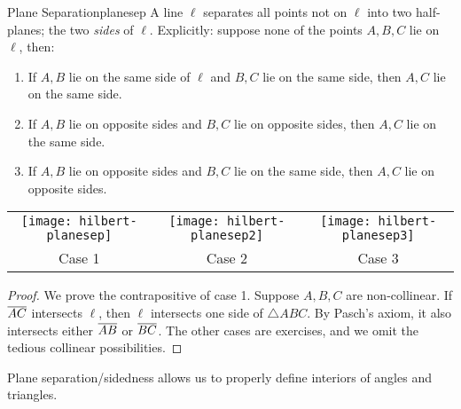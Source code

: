 \begin{thm}{Plane Separation}{planesep}
	A line $\ell$ separates all points not on $\ell$ into two half-planes; the two \emph{sides} of $\ell$. Explicitly: suppose none of the points $A,B,C$ lie on $\ell$, then:
	\begin{enumerate}\itemsep0pt
	  \item If $A,B$ lie on the same side of $\ell$ and $B,C$ lie on the same side, then $A,C$ lie on the same side.
	  \item If $A,B$ lie on opposite sides and $B,C$ lie on opposite sides, then $A,C$ lie on the same side.
	  \item If $A,B$ lie on opposite sides and $B,C$ lie on the same side, then $A,C$ lie on opposite sides.
	\end{enumerate}\vspace{-10pt}
	\begin{center}
		\begin{tabular}{c@{\qquad}c@{\qquad}c}
			\texttt{[image: hilbert-planesep]}
			&
			\texttt{[image: hilbert-planesep2]}
			&
			\texttt{[image: hilbert-planesep3]}
			\\
			Case 1
			&
			Case 2
			&
			Case 3
		\end{tabular}
	\end{center}
\end{thm}

\begin{proof}
	We prove the contrapositive of case 1. Suppose $A,B,C$ are non-collinear. If $\overline{AC}$ intersects $\ell$, then $\ell$ intersects one side of $\triangle ABC$. By Pasch's axiom, it also intersects either $\overline{AB}$ or $\overline{BC}$.\smallbreak
	The other cases are exercises, and we omit the tedious collinear possibilities.
\end{proof}

Plane separation/sidedness allows us to properly define interiors of angles and triangles. 

